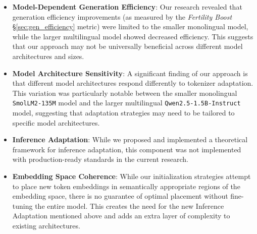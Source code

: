 \begin{itemize}
    \item \textbf{Model-Dependent Generation Efficiency}: Our research revealed that generation efficiency improvements (as measured by the \textit{Fertility Boost} \S \ref{sec:gen_efficiency} metric) were limited to the smaller monolingual model, while the larger multilingual model showed decreased efficiency. This suggests that our approach may not be universally beneficial across different model architectures and sizes.
    
    \item \textbf{Model Architecture Sensitivity}: A significant finding of our approach is that different model architectures respond differently to tokenizer adaptation. This variation was particularly notable between the smaller monolingual \texttt{SmolLM2-135M} model and the larger multilingual \texttt{Qwen2.5-1.5B-Instruct} model, suggesting that adaptation strategies may need to be tailored to specific model architectures.
    
    \item \textbf{Inference Adaptation}: While we proposed and implemented a theoretical framework for inference adaptation, this component was not implemented with production-ready standards in the current research.
    
    
    \item \textbf{Embedding Space Coherence}: While our initialization strategies attempt to place new token embeddings in semantically appropriate regions of the embedding space, there is no guarantee of optimal placement without fine-tuning the entire model. This creates the need for the new Inference Adaptation mentioned above and adds an extra layer of complexity to existing architectures.
    

\end{itemize}
